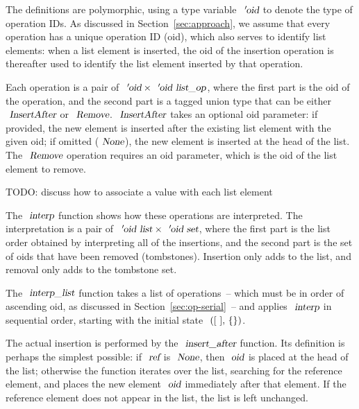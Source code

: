 The definitions are polymorphic, using a type variable $\isa{{\isacharprime}oid}$ to denote the type of operation IDs.
As discussed in Section~\ref{sec:approach}, we assume that every operation has a unique operation ID (oid), which also serves to identify list elements: when a list element is inserted, the oid of the insertion operation is thereafter used to identify the list element inserted by that operation.

Each operation is a pair of $\isa{{\isacharprime}oid} \mathbin{\isasymtimes} \isa{{\isacharprime}oid\ list{\isacharunderscore}op}$, where the first part is the oid of the operation, and the second part is a tagged union type that can be either $\isa{InsertAfter}$ or $\isa{Remove}$.
$\isa{InsertAfter}$ takes an optional oid parameter: if provided, the new element is inserted after the existing list element with the given oid; if omitted ($\isa{None}$), the new element is inserted at the head of the list.
The $\isa{Remove}$ operation requires an oid parameter, which is the oid of the list element to remove.

TODO: discuss how to associate a value with each list element

The $\isa{interp}$ function shows how these operations are interpreted.
The interpretation is a pair of $\isa{{\isacharprime}oid\ list} \mathbin{\isasymtimes} \isa{{\isacharprime}oid\ set}$, where the first part is the list order obtained by interpreting all of the insertions, and the second part is the set of oids that have been removed (tombstones).
Insertion only adds to the list, and removal only adds to the tombstone set.

The $\isa{interp{\isacharunderscore}list}$ function takes a list of operations~-- which must be in order of ascending oid, as discussed in Section~\ref{sec:op-serial}~-- and applies $\isa{interp}$ in sequential order, starting with the initial state $\isa{{\isacharparenleft}{\isacharbrackleft}\ {\isacharbrackright}{\isacharcomma}\ {\isacharbraceleft}{\isacharbraceright}{\isacharparenright}}$.

The actual insertion is performed by the $\isa{insert{\isacharunderscore}after}$ function.
Its definition is perhaps the simplest possible: if $\isa{ref}$ is $\isa{None}$, then $\isa{oid}$ is placed at the head of the list; otherwise the function iterates over the list, searching for the reference element, and places the new element $\isa{oid}$ immediately after that element.
If the reference element does not appear in the list, the list is left unchanged.

